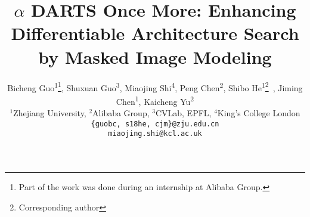 \documentclass[10pt,twocolumn,letterpaper]{article}
\begin{document}
\title{$\alpha$ DARTS Once More: Enhancing Differentiable Architecture Search \\
by Masked Image Modeling}

\author{Bicheng Guo\textsuperscript{1}\thanks{Part of the work was done during an internship at Alibaba Group.}, Shuxuan Guo\textsuperscript{3}, Miaojing Shi\textsuperscript{4}, Peng Chen\textsuperscript{2}, Shibo He\textsuperscript{1}\thanks{Corresponding author}~, Jiming Chen\textsuperscript{1}, Kaicheng Yu\textsuperscript{2}
\\
$^1$Zhejiang University, $^2$Alibaba Group, $^3$CVLab, EPFL,  $^4$King's College London
\\
{\tt \small \{guobc, s18he, cjm\}@zju.edu.cn} \\
{\tt \small miaojing.shi@kcl.ac.uk}  }

\maketitle
\end{document}
